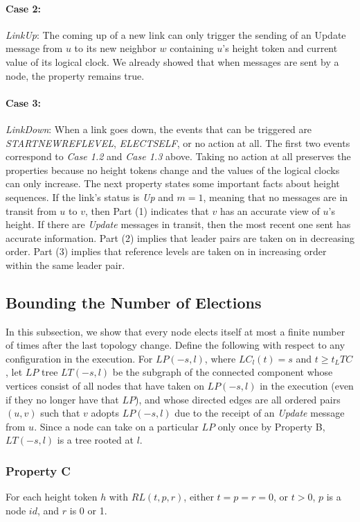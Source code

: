 \documentclass{article}
\begin{document}
\paragraph{Case 2:}
\textit{LinkUp}: The coming up of a new link can only trigger the sending of an Update message from $u$ to its new neighbor $w$ containing $u$’s height token and current value of its logical clock. We already showed that when messages are sent by a node, the property remains true.
\paragraph{Case 3:}
\textit{LinkDown}: When a link goes down, the events that can be triggered are \textit{STARTNEWREFLEVEL}, \textit{ELECTSELF}, or no action at all. The first two events correspond to \textit{Case 1.2} and \textit{Case 1.3} above. Taking no action at all preserves the properties because no height tokens change and the values of the logical clocks can only increase. The next property states some important facts about height sequences. If the link’s status is \textit{Up} and $m = 1$, meaning that no messages are in transit from $u$ to $v$, then Part (1) indicates that $v$ has an accurate view of $u$’s height. If there are \textit{Update} messages in transit, then the most recent one sent has accurate information. Part (2) implies that leader pairs are taken on in decreasing order. Part (3) implies that reference levels are taken on in increasing order within the same leader pair.

\subsection{Bounding the Number of Elections}
In this subsection, we show that every node elects itself at most a finite number of times after the last topology change. Define the following with respect to any configuration in the execution. For $LP(−s, l)$, where $LC_l(t) = s$ and $t \geq t_LTC$, let $LP$ tree $LT(−s, l)$ be the subgraph of the connected component whose vertices consist of all nodes that have taken on $LP(−s, l)$ in the execution (even if they no longer have that $LP$), and whose directed edges are all ordered pairs $(u, v)$ such that $v$ adopts $LP(−s, l)$ due to the receipt of an \textit{Update} message from $u$. Since a node can take on a particular $LP$ only once by Property B, $LT(−s, l)$ is a tree rooted at $l$.

\subsubsection{Property C}
For each height token $h$ with $RL(t, p, r)$, either $t = p = r = 0$, or $t > 0$, $p$ is a node $id$, and $r$ is 0 or 1.
\end{document}
